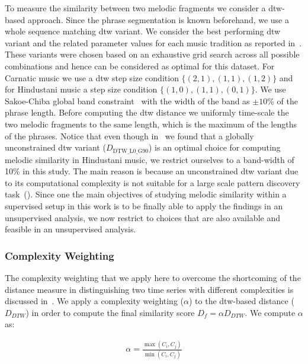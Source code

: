 To measure the similarity between two melodic fragments we consider a \gls{dtw}-based approach. Since the phrase segmentation is known beforehand, we use a whole sequence matching \gls{dtw} variant. We consider the best performing \gls{dtw} variant and the related parameter values for each music tradition as reported in~. These variants were chosen based on an exhaustive grid search across all possible combinations and hence can be considered as optimal for this dataset. For Carnatic music we use a \gls{dtw} step size condition $\lbrace(2,1), (1,1), (1,2)\rbrace$  and for Hindustani music a step size condition $\lbrace(1,0), (1,1), (0,1)\rbrace$.  We use Sakoe-Chiba global band constraint~\cite{Sakoe78TASLP} with the width of the band as $\pm10$\% of the phrase length. Before computing the \gls{dtw} distance we uniformly time-scale the two melodic fragments to the same length, which is the maximum of the lengths of the phrases. Notice that even though in~ we found that a globally unconstrained \gls{dtw} variant ($D_{\mathrm{DTW\_L0\_G90}}$) is an optimal choice for computing melodic similarity in Hindustani music, we restrict ourselves to a band-width of 10\% in this study. The main reason is because an unconstrained \gls{dtw} variant due to its computational complexity is not suitable for a large scale pattern discovery task~(). Since one the main objectives of studying melodic similarity within a supervised setup in this work is to be finally able to apply the findings in an unsupervised analysis, we now restrict to choices that are also available and feasible in an unsupervised analysis. 


\subsubsection{Complexity Weighting}
\label{sec:patterns_improving_similarity_complexity_invariance_weighting}

The complexity weighting that we apply here to overcome the shortcoming of the distance measure in distinguishing two time series with different complexities is discussed in~\cite{batista2011complexity}. We apply a complexity weighting ($\alpha$) to the \gls{dtw}-based distance ($D_{DTW}$) in order to compute the final similarity score $D_{f}=\alpha D_{DTW}$. We compute $\alpha$ as:


\begin{equation}
\begin{gathered}
\alpha = \frac{\max(C_i,C_j)}{\min(C_i, C_j)} \\
\end{gathered}
\label{eq:complexity_weighing}
\end{equation}

